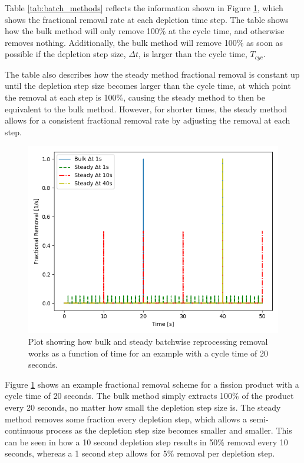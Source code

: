 Table \ref{tab:batch_methods} reflects the information shown in Figure \ref{fig:bulk_repr_cnst}, which shows the fractional removal rate at each depletion time step. The table shows how the bulk method will only remove 100\% at the cycle time, and otherwise removes nothing. Additionally, the bulk method will remove 100\% as soon as possible if the depletion step size, $\Delta t$, is larger than the cycle time, $T_{cyc}$. 

The table also describes how the steady method fractional removal is constant up until the depletion step size becomes larger than the cycle time, at which point the removal at each step is 100\%, causing the steady method to then be equivalent to the bulk method. However, for shorter times, the steady method allows for a consistent fractional removal rate by adjusting the removal at each step.


\begin{figure}[H]
  \centering
  \includegraphics[scale=0.75]{images/bulk-compare-cycles.png}
  \caption{Plot showing how bulk and steady batchwise reprocessing removal works as a function of time for an example with a cycle time of 20 seconds.}
   \label{fig:bulk_repr_cnst}
\end{figure}

Figure \ref{fig:bulk_repr_cnst} shows an example fractional removal scheme for a fission product with a cycle time of 20 seconds. The bulk method simply extracts 100\% of the product every 20 seconds, no matter how small the depletion step size is. The steady method removes some fraction every depletion step, which allows a semi-continuous process as the depletion step size becomes smaller and smaller. This can be seen in how a 10 second depletion step results in 50\% removal every 10 seconds, whereas a 1 second step allows for 5\% removal per depletion step.


